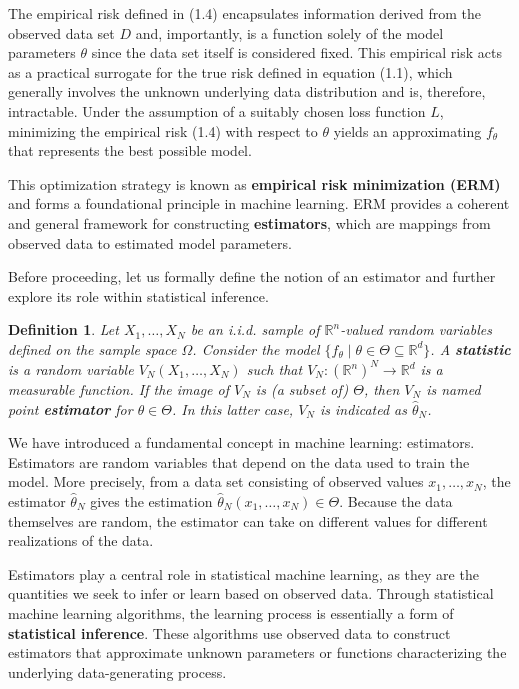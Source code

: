 \documentclass{report}
\newtheorem{definition}{Definition}[chapter]
\begin{document}
The empirical risk defined in (1.4) encapsulates information derived from the observed data set $D$ and, importantly, is a function solely of the model parameters $\theta$ since the data set itself is considered fixed. This empirical risk acts as a practical surrogate for the true risk defined in equation (1.1), which generally involves the unknown underlying data distribution and is, therefore, intractable. Under the assumption of a suitably chosen loss function $L$, minimizing the empirical risk (1.4) with respect to $\theta$ yields an approximating $f_\theta$ that represents the best possible model.

This optimization strategy is known as \textbf{empirical risk minimization (ERM)} and forms a foundational principle in machine learning. ERM provides a coherent and general framework for constructing \textbf{estimators}, which are mappings from observed data to estimated model parameters.

Before proceeding, let us formally define the notion of an estimator and further explore its role within statistical inference.

\begin{definition}
Let $X_1,\dots,X_N$ be an i.i.d. sample of $\mathbb{R}^n$-valued random variables defined on the sample space $\Omega$. Consider the model $\{f_\theta \mid \theta \in \Theta \subseteq \mathbb{R}^d \}$. A \textbf{statistic} is a random variable $V_N(X_1,\dots,X_N)$ such that $V_N : (\mathbb{R}^n)^N \to \mathbb{R}^d$ is a measurable function. If the image of $V_N$ is (a subset of) $\Theta$, then $V_N$ is named point \textbf{estimator} for $\theta \in \Theta$. In this latter case, $V_N$ is indicated as $\hat{\theta}_N$.
\end{definition}

We have introduced a fundamental concept in machine learning: estimators. Estimators are random variables that depend on the data used to train the model. More precisely, from a data set consisting of observed values $x_1,\dots,x_N$, the estimator $\hat{\theta}_N$ gives the estimation $\hat{\theta}_N(x_1,\dots,x_N) \in \Theta$. Because the data themselves are random, the estimator can take on different values for different realizations of the data.

Estimators play a central role in statistical machine learning, as they are the quantities we seek to infer or learn based on observed data. Through statistical machine learning algorithms, the learning process is essentially a form of \textbf{statistical inference}. These algorithms use observed data to construct estimators that approximate unknown parameters or functions characterizing the underlying data-generating process.
\end{document}
